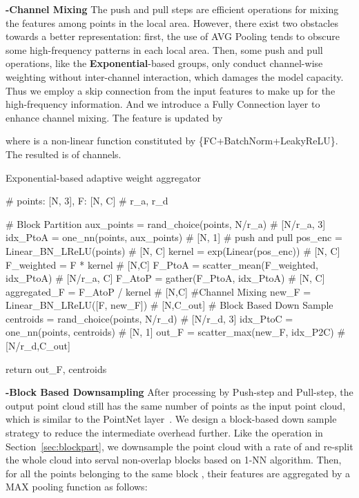\documentclass[journal]{IEEEtran}
\begin{document}
\noindent
{\bf -Channel Mixing} The push and pull steps are efficient operations for mixing the features among points in the local area. However, there exist two obstacles towards a better representation: first, the use of AVG Pooling tends to obscure some high-frequency patterns in each local area. Then, some push and pull operations, like the {\bf Exponential}-based groups, only conduct channel-wise weighting without inter-channel interaction, which damages the model capacity. Thus we employ a skip connection from the input features to make up for the high-frequency information. And we introduce a Fully Connection layer to enhance channel mixing. The feature is updated by 

where  is a non-linear function constituted by \{FC+BatchNorm+LeakyReLU\}. The resulted  is of  channels.

\begin{algorithm}[t]
  \caption{Exponential-based adaptive weight aggregator}
  \begin{algorithmic}\label{alg:expaw}
  \STATE
    \begin{python}
    # points: [N, 3], F: [N, C]
    # r_a, r_d
    
    # Block Partition
    aux_points = rand_choice(points, N/r_a) 
                                # [N/r_a, 3]
    idx_PtoA = one_nn(points, aux_points) 
                                    # [N, 1]
    # push and pull
    pos_enc = Linear_BN_LReLU(points) # [N, C]
    kernel = exp(Linear(pos_enc)) # [N, C]
    F_weighted = F * kernel # [N,C]
    F_PtoA = scatter_mean(F_weighted, idx_PtoA) 
                                    # [N/r_a, C]
    F_AtoP = gather(F_PtoA, idx_PtoA) # [N, C]
    aggregated_F = F_AtoP / kernel # [N,C]
    #Channel Mixing
    new_F = Linear_BN_LReLU([F, new_F]) 
                            # [N,C_out]
    # Block Based Down Sample
    centroids = rand_choice(points, N/r_d) 
                                # [N/r_d, 3]
    idx_PtoC = one_nn(points, centroids) 
                                    # [N, 1]
    out_F = scatter_max(new_F, idx_P2C) 
                        # [N/r_d,C_out]
    
    return out_F, centroids
    \end{python}
  \end{algorithmic}
\end{algorithm}

\noindent
{\bf -Block Based Downsampling}
After processing by Push-step and Pull-step, the output point cloud still has the same number of points as the input point cloud, which is similar to the PointNet layer~\cite{PointNet}. We design a block-based down sample strategy to reduce the intermediate overhead further. Like the operation in Section~\ref{sec:blockpart}, we downsample the point cloud with a rate of  and re-split the whole cloud into serval non-overlap blocks  based on 1-NN algorithm. Then, for all the points belonging to the same block , their features are aggregated by a MAX pooling function as follows:
\end{document}
